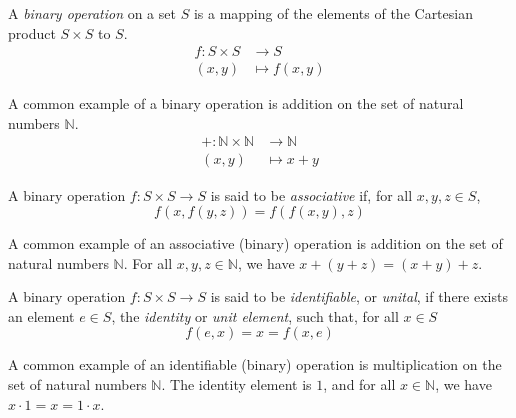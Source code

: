 \documentclass[
	11pt, %
	fleqn, %
	a4paper, %
]{LegrandOrangeBook}
\begin{document}
\begin{definition}
    A \emph{binary operation} on a set $S$ is a mapping of the elements of the Cartesian product $S \times S$ to $S$.
    \[ \begin{split}
            f : S \times S & \to S \\ (x,y) &\mapsto f(x,y)
        \end{split}\]
\end{definition}

\begin{example}
    A common example of a binary operation is addition on the set of natural numbers $\mathbb{N}$.
    \begin{equation}
        \begin{split}
            + : \mathbb{N} \times \mathbb{N} & \to \mathbb{N} \\ (x,y) &\mapsto x+y
        \end{split}
    \end{equation}
\end{example}

\begin{definition}
    A binary operation $f: S \times S \to S$ is said to be \emph{associative} if, for all $x,y,z \in S$, 
    \[ f(x,f(y,z)) = f(f(x,y),z) \]
\end{definition}

\begin{example}
    A common example of an associative (binary) operation is addition on the set of natural numbers $\mathbb{N}$. For all $x,y,z \in \mathbb{N}$, we have $x + (y + z) = (x + y) + z$.
\end{example}

\newpage

\begin{definition}
    A binary operation $f: S \times S \to S$ is said to be \emph{identifiable}, or \emph{unital}, if there exists an element $e \in S$, the \emph{identity} or \emph{unit element}, such that, for all $x \in S$
    \[ f(e,x) = x = f(x,e) \]
\end{definition}

\begin{example}
    A common example of an identifiable (binary) operation is multiplication on the set of natural numbers $\mathbb{N}$. The identity element is $1$, and for all $x \in \mathbb{N}$, we have $x \cdot 1 = x = 1 \cdot x$.
\end{example}
\end{document}
